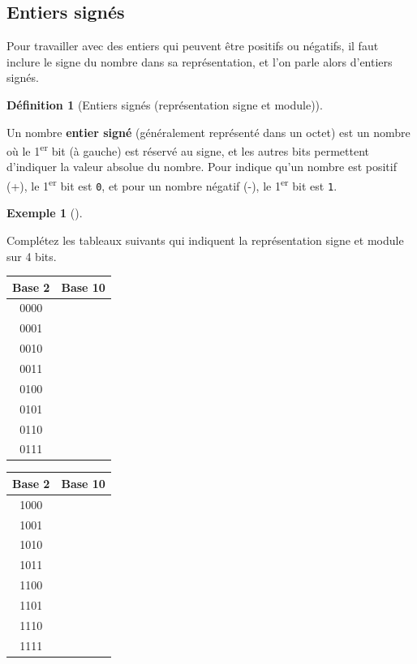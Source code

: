 \documentclass[
  letterpaper,
]{scrbook}
\theoremstyle{definition}
\newtheorem{example}{Exemple}[chapter]
\theoremstyle{definition}
\newtheorem{definition}{Définition}[chapter]
\theoremstyle{plain}
\theoremstyle{remark}
\begin{document}
\hypertarget{entiers-signuxe9s}{%
\subsection{Entiers signés}\label{entiers-signuxe9s}}

Pour travailler avec des entiers qui peuvent être positifs ou négatifs,
il faut inclure le signe du nombre dans sa représentation, et l'on parle
alors d'entiers signés.

\leavevmode{}%
\begin{definition}[Entiers signés (représentation signe et
module)]\label{def-entiers-signes}

Un nombre \textbf{entier signé} (généralement représenté dans un octet)
est un nombre où le 1\textsuperscript{er} bit (à gauche) est réservé au
signe, et les autres bits permettent d'indiquer la valeur absolue du
nombre. Pour indique qu'un nombre est positif (+), le
1\textsuperscript{er} bit est \texttt{0}, et pour un nombre négatif (-),
le 1\textsuperscript{er} bit est \texttt{1}.

\end{definition}

\leavevmode{}%
\begin{example}[]\label{exm-completion-tableau-signe-module-4-bits}

Complétez les tableaux suivants qui indiquent la représentation signe et
module sur 4 bits.

\begin{longtable}[]{@{}cc@{}}
\toprule()
\textbf{Base 2} & \textbf{Base 10} \\
\midrule()
\endhead
0000 & \\
0001 & \\
0010 & \\
0011 & \\
0100 & \\
0101 & \\
0110 & \\
0111 & \\
\bottomrule()
\end{longtable}

\begin{longtable}[]{@{}cc@{}}
\toprule()
\textbf{Base 2} & \textbf{Base 10} \\
\midrule()
\endhead
1000 & \\
1001 & \\
1010 & \\
1011 & \\
1100 & \\
1101 & \\
1110 & \\
1111 & \\
\bottomrule()
\end{longtable}

\end{example}
\end{document}
